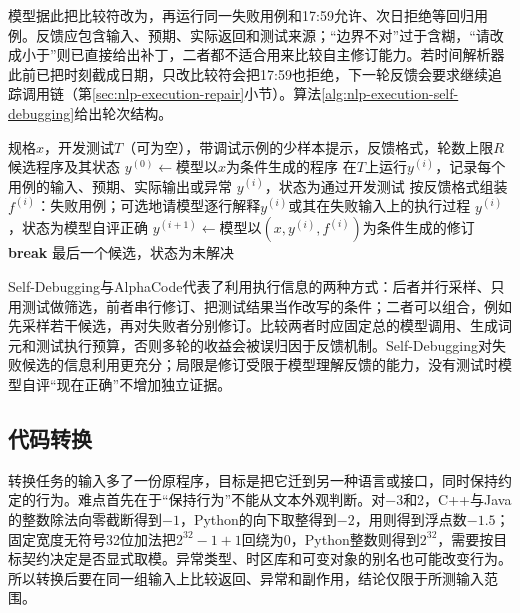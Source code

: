 模型据此把比较符改为\code{<}，再运行同一失败用例和17:59允许、次日拒绝等回归用例。反馈应包含输入、预期、实际返回和测试来源；“边界不对”过于含糊，“请改成小于”则已直接给出补丁，二者都不适合用来比较自主修订能力。若时间解析器此前已把时刻截成日期，只改比较符会把17:59也拒绝，下一轮反馈会要求继续追踪调用链（第\ref{sec:nlp-execution-repair}小节）。算法\ref{alg:nlp-execution-self-debugging}给出轮次结构。

\begin{algorithm}
  \label{alg:nlp-execution-self-debugging}
  \begin{algorithmic}[1]
    \Require 规格$x$，开发测试$T$（可为空），带调试示例的少样本提示，反馈格式，轮数上限$R$
    \Ensure 候选程序及其状态
    \State $y^{(0)}\gets$模型以$x$为条件生成的程序
      \State 在$T$上运行$y^{(i)}$，记录每个用例的输入、预期、实际输出或异常
        \State \Return $y^{(i)}$，状态为通过开发测试
      \EndIf
      \State 按反馈格式组装$f^{(i)}$：失败用例；可选地请模型逐行解释$y^{(i)}$或其在失败输入上的执行过程
        \State \Return $y^{(i)}$，状态为模型自评正确
      \EndIf
      \State $y^{(i+1)}\gets$模型以$(x,y^{(i)},f^{(i)})$为条件生成的修订
        \State \textbf{break}
      \EndIf
    \EndFor
    \State \Return 最后一个候选，状态为未解决
  \end{algorithmic}
\end{algorithm}

Self-Debugging与AlphaCode代表了利用执行信息的两种方式：后者并行采样、只用测试做筛选，前者串行修订、把测试结果当作改写的条件；二者可以组合，例如先采样若干候选，再对失败者分别修订。比较两者时应固定总的模型调用、生成词元和测试执行预算，否则多轮的收益会被误归因于反馈机制。Self-Debugging对失败候选的信息利用更充分；局限是修订受限于模型理解反馈的能力，没有测试时模型自评“现在正确”不增加独立证据。

\subsection{代码转换}
\label{sec:nlp-execution-transformation}

转换任务的输入多了一份原程序，目标是把它迁到另一种语言或接口，同时保持约定的行为。难点首先在于“保持行为”不能从文本外观判断。对$-3$和2，C++与Java的整数除法向零截断得到$-1$，Python的向下取整得到$-2$，用\code{/}则得到浮点数$-1.5$；固定宽度无符号32位加法把$2^{32}-1+1$回绕为0，Python整数则得到$2^{32}$，需要按目标契约决定是否显式取模。异常类型、时区库和可变对象的别名也可能改变行为。所以转换后要在同一组输入上比较返回、异常和副作用，结论仅限于所测输入范围。

